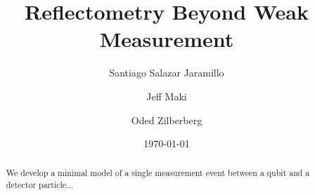 \documentclass[10pt,
 amsmath,amssymb,
 aps,prb, twocolumn
]{revtex4-2}
\begin{document}
\title{Reflectometry Beyond Weak Measurement}

\author{Santiago Salazar Jaramillo}

\author{Jeff Maki}

\author{Oded Zilberberg}


\date{\today}

\begin{abstract}
    We develop a minimal model of a single measurement event between a qubit and a detector particle...
\end{abstract}

\maketitle
\end{document}
